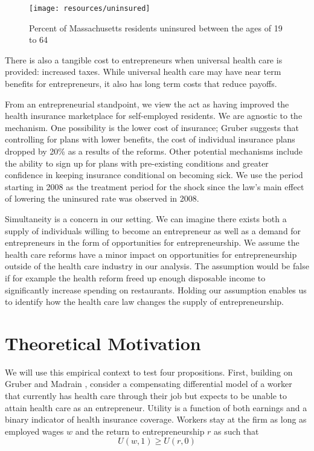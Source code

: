 \documentclass[12pt]{article}
\begin{document}
\begin{figure}[H]
	\centering
	\texttt{[image: resources/uninsured]}
	\caption{Percent of Massachusetts residents uninsured between the ages of 19 to 64}
	\label{fig:uninsuredRate}
\end{figure}

There is also a tangible cost to entrepreneurs when universal health care is provided: increased taxes.  While universal health care may have near term benefits for entrepreneurs, it also has long term costs that reduce payoffs. 

From an entrepreneurial standpoint, we view the act as having improved the health insurance marketplace for self-employed residents. We are agnostic to the mechanism. One possibility is the lower cost of insurance; Gruber \cite{gruber} suggests that controlling for plans with lower benefits, the cost of individual insurance plans dropped by 20\% as a results of the reforms. Other potential mechanisms include the ability to sign up for plans with pre-existing conditions and greater confidence in keeping insurance conditional on becoming sick. We use the period starting in 2008 as the treatment period for the shock since the law's main effect of lowering the uninsured rate was observed in 2008. 

Simultaneity is a concern in our setting. We can imagine there exists both a supply of individuals willing to become an entrepreneur as well as a demand for entrepreneurs in the form of opportunities for entrepreneurship. We assume the health care reforms have a minor impact on opportunities for entrepreneurship outside of the health care industry in our analysis. The assumption would be false if for example the health reform freed up enough disposable income to significantly increase spending on restaurants. Holding our assumption enables us to identify how the health care law changes the supply of entrepreneurship. 

\section{Theoretical Motivation}
\label{sec:model}

We will use this empirical context to test four propositions. First, building on Gruber and Madrain \cite{gm2002}, consider a compensating differential model of a worker that currently has health care through their job but expects to be unable to attain health care as an entrepreneur. Utility is a function of both earnings and a binary indicator of health insurance coverage. Workers stay at the firm as long as employed wages $w$ and the return to entrepreneurship $r$ as such that
$$U(w,1) \ge U(r,0)$$
\end{document}
